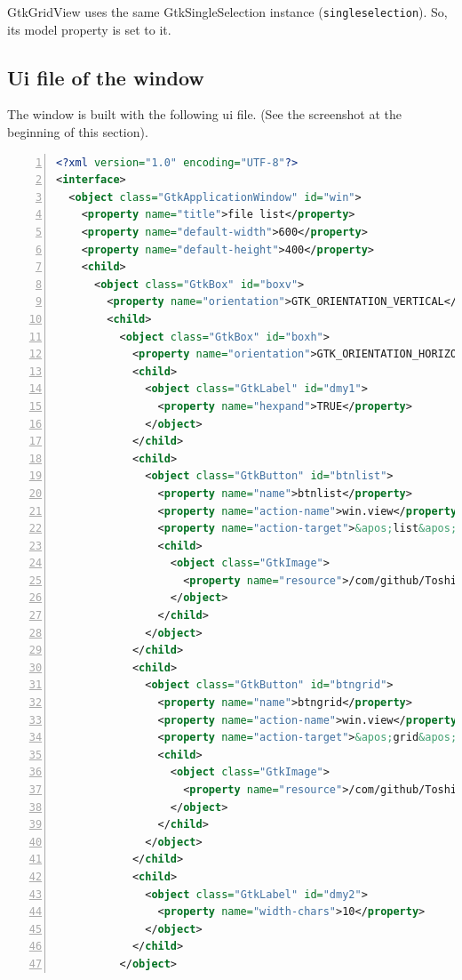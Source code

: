 GtkGridView uses the same GtkSingleSelection instance
(\passthrough{\lstinline!singleselection!}). So, its model property is
set to it.

\subsection{Ui file of the window}\label{ui-file-of-the-window}

The window is built with the following ui file. (See the screenshot at
the beginning of this section).

\begin{lstlisting}[language=XML, numbers=left]
<?xml version="1.0" encoding="UTF-8"?>
<interface>
  <object class="GtkApplicationWindow" id="win">
    <property name="title">file list</property>
    <property name="default-width">600</property>
    <property name="default-height">400</property>
    <child>
      <object class="GtkBox" id="boxv">
        <property name="orientation">GTK_ORIENTATION_VERTICAL</property>
        <child>
          <object class="GtkBox" id="boxh">
            <property name="orientation">GTK_ORIENTATION_HORIZONTAL</property>
            <child>
              <object class="GtkLabel" id="dmy1">
                <property name="hexpand">TRUE</property>
              </object>
            </child>
            <child>
              <object class="GtkButton" id="btnlist">
                <property name="name">btnlist</property>
                <property name="action-name">win.view</property>
                <property name="action-target">&apos;list&apos;</property>
                <child>
                  <object class="GtkImage">
                    <property name="resource">/com/github/ToshioCP/list4/list.png</property>
                  </object>
                </child>
              </object>
            </child>
            <child>
              <object class="GtkButton" id="btngrid">
                <property name="name">btngrid</property>
                <property name="action-name">win.view</property>
                <property name="action-target">&apos;grid&apos;</property>
                <child>
                  <object class="GtkImage">
                    <property name="resource">/com/github/ToshioCP/list4/grid.png</property>
                  </object>
                </child>
              </object>
            </child>
            <child>
              <object class="GtkLabel" id="dmy2">
                <property name="width-chars">10</property>
              </object>
            </child>
          </object>

\end{lstlisting}
